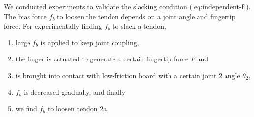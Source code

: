 \documentclass{llncs}
\begin{document}
We conducted experiments to validate the slacking condition (\ref{eq:independent-f}).
The bias force $f_b$ to loosen the tendon depends on a joint angle and fingertip force.
For experimentally finding $f_b$ to slack a tendon,
\begin{enumerate}
	\item large $f_b$ is applied to keep joint coupling,
	\item the finger is actuated to generate a certain fingertip force $F$ and
	\item is brought into contact with low-friction board with a certain joint 2 angle $\theta_2$,
	\item $f_b$ is decreased gradually, and finally
	\item we find $f_b$ to loosen tendon 2a.
\end{enumerate}
\end{document}

